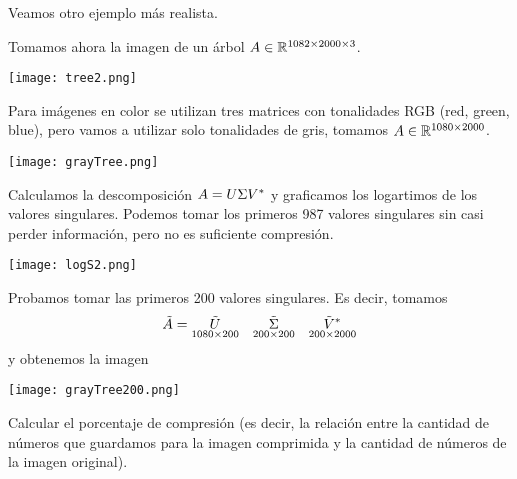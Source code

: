 Veamos otro ejemplo más realista.

\begin{ejemplo}

Tomamos ahora la imagen de un \'arbol $\Ab \in \R^{1082 \times 2000 \times 3}$.

\begin{center}
\texttt{[image: tree2.png]}
\end{center}

Para imágenes en color se utilizan tres matrices con tonalidades RGB (red, green, blue), pero vamos a utilizar solo tonalidades de gris, tomamos $\Ab \in \R^{1080 \times 2000}$.

\begin{center}
\texttt{[image: grayTree.png]}
\end{center}

Calculamos la descomposición $\Ab = \Ub \Sigmab \Vb^*$ y graficamos los logartimos de los valores singulares. Podemos tomar los primeros 987 valores singulares sin casi perder información, pero no es suficiente compresión.

\begin{center}
\texttt{[image: logS2.png]}
\end{center}

Probamos tomar las primeros 200 valores singulares. Es decir, tomamos
$$\tilde \Ab = \underset{1080 \times 200}{\tilde \Ub} \quad
\underset{200 \times 200} {\tilde \Sigmab} \quad
\underset{200 \times 2000}{\tilde \Vb^*}
$$
y obtenemos la imagen
\begin{center}
\texttt{[image: grayTree200.png]}
\end{center}

\end{ejemplo}

\begin{ejercicio}
Calcular el porcentaje de compresión (es decir, la relación entre la cantidad de números que guardamos para la imagen comprimida y la cantidad de números de la imagen original).
\end{ejercicio}


